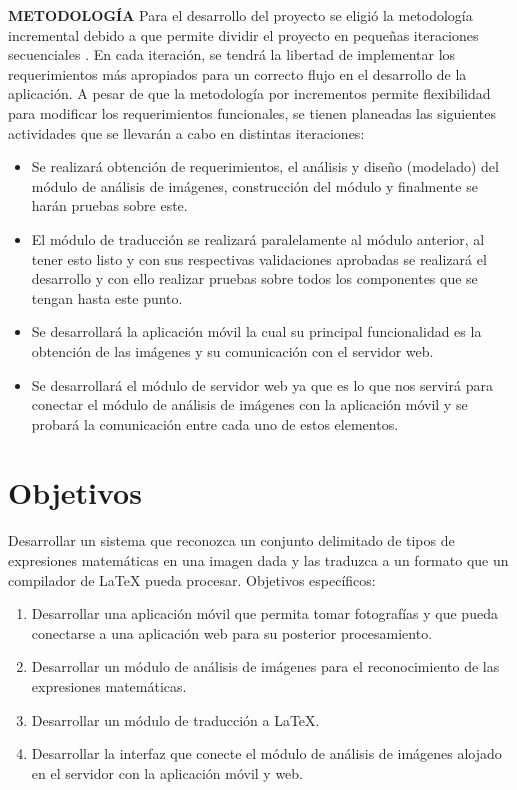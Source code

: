 \textbf{METODOLOGÍA} Para el desarrollo del proyecto se eligió la metodología incremental debido a que permite dividir el proyecto en pequeñas iteraciones secuenciales \cite{iterativeDevelopment}. En cada iteración, se tendrá la libertad de implementar los requerimientos más apropiados para un correcto flujo en el desarrollo de la aplicación. A pesar de que la metodología por incrementos permite flexibilidad para modificar los requerimientos funcionales, se tienen planeadas las siguientes actividades que se llevarán a cabo en distintas iteraciones:
\bigskip
\begin{itemize}
    \item Se realizará obtención de requerimientos, el análisis y diseño (modelado) del módulo de análisis de imágenes, construcción del módulo y finalmente se harán pruebas sobre este.
    \item El módulo de traducción se realizará paralelamente al módulo anterior, al tener esto listo y con sus respectivas validaciones aprobadas se realizará el desarrollo y con ello realizar pruebas sobre todos los componentes que se tengan hasta este punto.
    \item Se desarrollará la aplicación móvil la cual su principal funcionalidad es la obtención de las imágenes y su comunicación con el servidor web.
    \item Se desarrollará el módulo de servidor web ya que es lo que nos servirá para conectar el módulo de análisis de imágenes con la aplicación móvil y se probará la comunicación entre cada uno de estos elementos.
\end{itemize}





\section{Objetivos}
Desarrollar un sistema que reconozca un conjunto delimitado de tipos de expresiones matemáticas en una imagen dada y las traduzca a un formato que un compilador de LaTeX pueda procesar.
\bigskip
Objetivos específicos:
\begin{enumerate}
    \item Desarrollar una aplicación móvil que permita tomar fotografías y que pueda conectarse a una aplicación web para su posterior procesamiento.
    \item Desarrollar un módulo de análisis de imágenes para el reconocimiento de las expresiones matemáticas.
    \item Desarrollar un módulo de traducción a LaTeX.
    \item Desarrollar la interfaz que conecte el módulo de análisis de imágenes alojado en el servidor con la aplicación móvil y web.
\end{enumerate}


